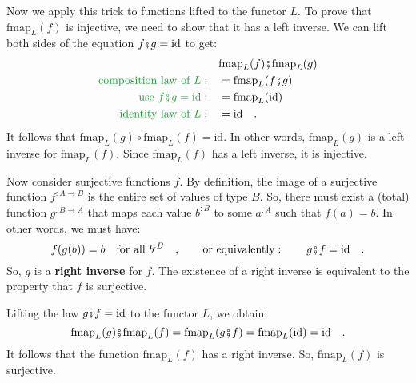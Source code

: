 Now we apply this trick to functions lifted to the functor $L$. To
prove that $\text{fmap}_{L}(f)$ is injective, we need to show that
it has a left inverse. We can lift both sides of the equation $f\bef g=\text{id}$
to get:
\begin{align*}
 & \text{fmap}_{L}(f)\bef\text{fmap}_{L}(g)\\
{\color{greenunder}\text{composition law of }L:}\quad & =\text{fmap}_{L}(f\bef g)\\
{\color{greenunder}\text{use }f\bef g=\text{id}:}\quad & =\text{fmap}_{L}(\text{id})\\
{\color{greenunder}\text{identity law of }L:}\quad & =\text{id}\quad.
\end{align*}
It follows that $\text{fmap}_{L}(g)\circ\text{fmap}_{L}(f)=\text{id}$.
In other words, $\text{fmap}_{L}(g)$ is a left inverse for $\text{fmap}_{L}(f)$.
Since $\text{fmap}_{L}(f)$ has a left inverse, it is injective.

Now consider surjective functions $f$. By definition, the image of
a surjective function $f^{:A\rightarrow B}$ is the entire set of
values of type $B$. So, there must exist a (total) function $g^{:B\rightarrow A}$
that maps each value $b^{:B}$ to some $a^{:A}$ such that $f(a)=b$.
In other words, we must have:
\[
f(g(b))=b\quad\text{for all }b^{:B}\quad,\quad\quad\text{or equivalently}:\quad\quad g\bef f=\text{id}\quad.
\]
So, $g$ is a \textbf{right inverse} for $f$.
The existence of a right inverse is equivalent to the property that
$f$ is surjective.

Lifting the law $g\bef f=\text{id}$ to the functor $L$, we obtain:
\[
\text{fmap}_{L}(g)\bef\text{fmap}_{L}(f)=\text{fmap}_{L}(g\bef f)=\text{fmap}_{L}(\text{id})=\text{id}\quad.
\]
It follows that the function $\text{fmap}_{L}(f)$ has a right inverse.
So, $\text{fmap}_{L}(f)$ is surjective.

